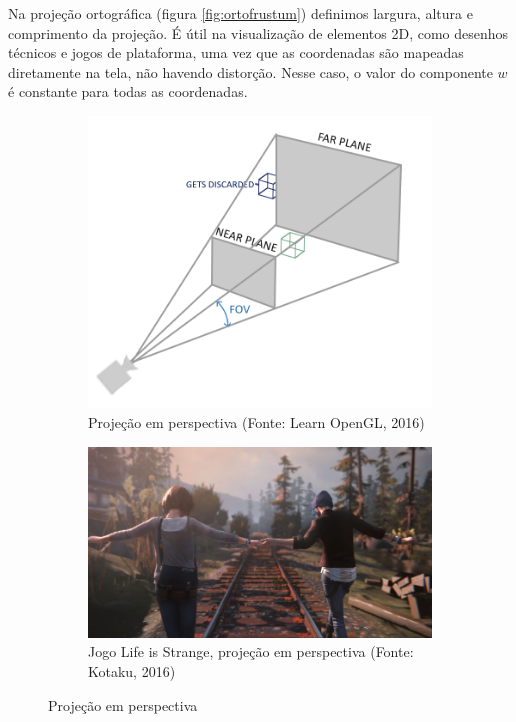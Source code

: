 Na projeção ortográfica (figura \ref{fig:ortofrustum}) definimos largura, altura e comprimento da projeção. É útil na visualização de elementos 2D, como desenhos técnicos e jogos de plataforma, uma vez que as coordenadas são mapeadas diretamente na tela, não havendo distorção. Nesse caso, o valor do componente $w$ é constante para todas as coordenadas.

\begin{figure}[H]
	\begin{subfigure}[b]{0.4\textwidth}
		\includegraphics[width=\textwidth]{imagens/perspective_frustum.png}
		\caption[Projeção em perspectiva]{Projeção em perspectiva (Fonte: Learn OpenGL, 2016)}
		\label{fig:perspfrustum}
	\end{subfigure}
	\hfill
	\begin{subfigure}[b]{0.4\textwidth}
		\includegraphics[width=\textwidth]{imagens/life-is-strange.jpg}
		\caption[Jogo Life is Strange, projeção em perspectiva]{Jogo Life is Strange, projeção em perspectiva (Fonte: Kotaku, 2016)}
		\label{fig:lifeisstrange}
	\end{subfigure}
	\caption{Projeção em perspectiva}
\end{figure}


